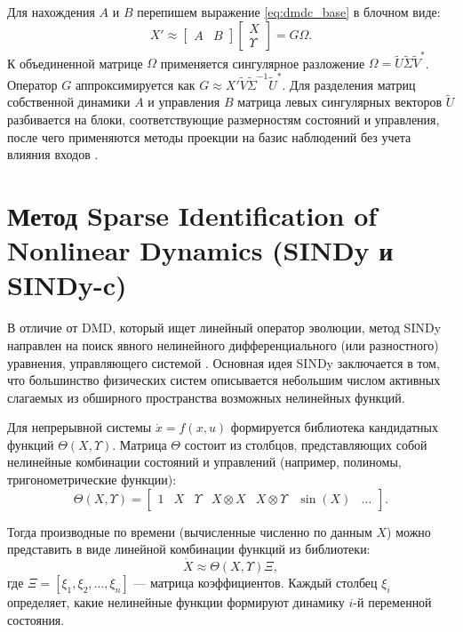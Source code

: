 Для нахождения $A$ и $B$ перепишем выражение \ref{eq:dmdc_base} в блочном виде:
\begin{equation}
\label{eq:dmdc_block}
X' \approx \begin{bmatrix} A & B \end{bmatrix} \begin{bmatrix} X \\ \Upsilon \end{bmatrix} = G \Omega.
\end{equation}
К объединенной матрице $\Omega$ применяется сингулярное разложение $\Omega = \tilde{U} \tilde{\Sigma} \tilde{V}^*$. Оператор $G$ аппроксимируется как $G \approx X' \tilde{V} \tilde{\Sigma}^{-1} \tilde{U}^*$. Для разделения матриц собственной динамики $A$ и управления $B$ матрица левых сингулярных векторов $\tilde{U}$ разбивается на блоки, соответствующие размерностям состояний и управления, после чего применяются методы проекции на базис наблюдений без учета влияния входов \cite{proctor2014dynamic}.


\section{Метод Sparse Identification of Nonlinear Dynamics (SINDy и SINDy-c)}
\label{sec:sindy}

В отличие от DMD, который ищет линейный оператор эволюции, метод SINDy направлен на поиск явного нелинейного дифференциального (или разностного) уравнения, управляющего системой \cite{brunton2016discovering}. Основная идея SINDy заключается в том, что большинство физических систем описывается небольшим числом активных слагаемых из обширного пространства возможных нелинейных функций.

Для непрерывной системы $\dot{x} = f(x, u)$ формируется библиотека кандидатных функций $\Theta(X, \Upsilon)$. Матрица $\Theta$ состоит из столбцов, представляющих собой нелинейные комбинации состояний и управлений (например, полиномы, тригонометрические функции):
\begin{equation}
\label{eq:sindy_library}
\Theta(X, \Upsilon) = \begin{bmatrix} 1 & X & \Upsilon & X \otimes X & X \otimes \Upsilon & \sin(X) & \dots \end{bmatrix}.
\end{equation}

Тогда производные по времени (вычисленные численно по данным $X$) можно представить в виде линейной комбинации функций из библиотеки:
\begin{equation}
\label{eq:sindy_approx}
\dot{X} \approx \Theta(X, \Upsilon) \Xi,
\end{equation}
где $\Xi = [\xi_1, \xi_2, \dots, \xi_n]$ --- матрица коэффициентов. Каждый столбец $\xi_i$ определяет, какие нелинейные функции формируют динамику $i$-й переменной состояния.

